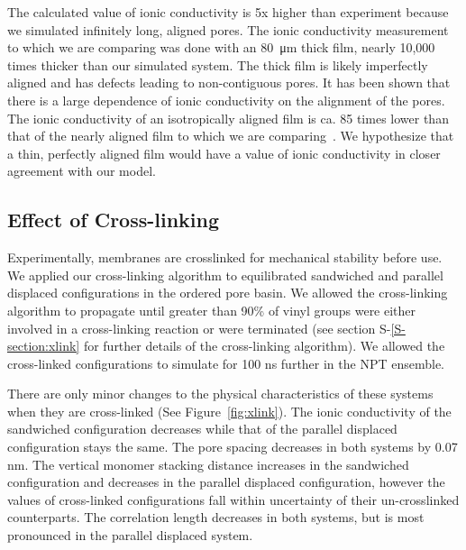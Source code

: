 \documentclass[journal=jpcbfk,manuscript=article]{achemso}
\begin{document}
  The calculated value of ionic conductivity is 5x higher than experiment because 
  we simulated infinitely long, aligned pores. The ionic conductivity measurement 
  to which we are comparing was done with an \SI{80}{\micro\metre} thick film, 
  nearly 10,000 times thicker than our simulated
  system. The thick film is likely imperfectly aligned and has defects leading to
  non-contiguous pores. It has been shown that there is a large dependence of 
  ionic conductivity on the alignment of the pores. The ionic conductivity of an
  isotropically aligned film is ca. 85 times lower than that of the nearly aligned
  film to which we are comparing~\cite{feng_scalable_2014}. We hypothesize that a 
  thin, perfectly aligned film would have a value of ionic conductivity in closer
  agreement with our model.

  \subsection{Effect of Cross-linking}\label{section:xlink}

  Experimentally, membranes are crosslinked for mechanical stability before use. We applied 
  our cross-linking algorithm to equilibrated sandwiched and parallel
  displaced configurations in the ordered pore basin. We allowed the cross-linking
  algorithm to propagate until greater than 90\% of vinyl groups were either involved
  in a cross-linking reaction or were terminated (see section S-\ref{S-section:xlink}
  for further details of the cross-linking algorithm). We allowed the cross-linked
  configurations to simulate for 100 ns further in the NPT ensemble. 

  There are only minor changes to the physical characteristics of these systems when 
  they are cross-linked (See Figure~\ref{fig:xlink}). The ionic conductivity of 
  the sandwiched configuration decreases while that of the parallel displaced 
  configuration stays the same. The pore spacing decreases in both systems by
  0.07 nm. The vertical monomer stacking distance increases in the sandwiched
  configuration and decreases in the parallel displaced configuration, however the 
  values of cross-linked configurations fall within uncertainty of their un-crosslinked
  counterparts. The correlation length decreases in both systems, 
  but is most pronounced in the parallel displaced system.  
  
\end{document}
